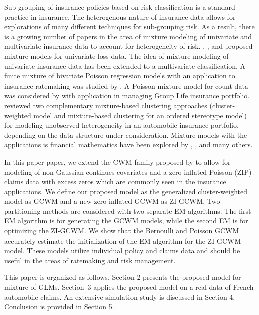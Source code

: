 \documentclass[11pt,letterpaper]{article}
\numberwithin{equation}{section}
\numberwithin{equation}{section}
\numberwithin{equation}{section}
\begin{document}
Sub-grouping of insurance policies based on risk classification is a standard practice in insurance. The heterogenous nature of insurance data allows for explorations of many different techniques for sub-grouping risk. As a result, there is a growing number of papers in the area of mixture modeling of univariate and multivariate insurance data to account for heterogeneity of risk. \cite{Lee+Lin:2010}, \cite{Verbelen+Gong+Antonio+Badescu+Lin:2015}, and \cite{Miljkovic+Grun:2016} proposed mixture models for univariate loss data. The idea of mixture modeling of univariate insurance data has been extended to a multivariate classification. A finite mixture of bivariate Poisson regression models with an application to insurance ratemaking was studied by \cite{Bermudez+Karlis:2012}. A Poisson mixture model for count data was considered by \cite{Brown+Buckley:2015} with application in managing Group Life insurance portfolio. \cite{risks_miljkovic} reviewed two complementary mixture-based clustering approaches (cluster-weighted model and mixture-based clustering for an ordered stereotype model) for modeling unobserved heterogeneity in an automobile insurance portfolio, depending on the data structure under consideration. Mixture models with the applications is financial mathematics have been explored by \cite{durham2007sv}, \cite{miljkovic2018new}, and many others.

In this paper paper, we extend the CWM family proposed by \cite{Ingrassia+Punzo+Vittadini+Minotti:2015} to allow for modeling of non-Gaussian continues covariates and a zero-inflated Poisson (ZIP) claims data with excess zeros which are commonly seen in the insurance applications. We define our proposed model as the generalized cluster-weighted model as GCWM and a new zero-inflated GCWM as ZI-GCWM. Two partitioning methods are considered with two separate EM algorithms. The first EM algorithm is for generating the GCWM models, while the second EM is for optimizing the ZI-GCWM. We show that the Bernoulli and Poisson GCWM accurately estimate the initialization of the EM algorithm for the ZI-GCWM model. These models utilize individual policy and claims data and should be useful in the areas of ratemaking and risk management.

This paper is organized as follows. Section 2 presents the proposed model for mixture of GLMs. Section~3 applies the proposed model on a real data of French automobile claims. An extensive simulation study is discussed in Section 4. Conclusion is provided in Section 5.
\end{document}
